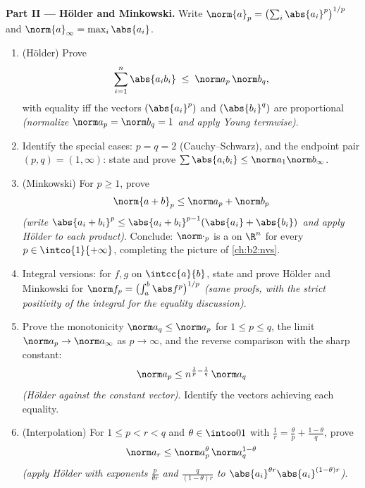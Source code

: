 \begin{problem}
\medskip
\noindent\textbf{Part II --- H\"older and Minkowski.} Write
$\norm{a}_p = \bigl(\sum_i \abs{a_i}^p\bigr)^{1/p}$ and
$\norm{a}_\infty = \max_i\abs{a_i}$.
\begin{enumerate}[resume]
  \item (H\"older) Prove
        \[
        \sum_{i=1}^{n}\abs{a_ib_i} \;\leq\;
        \norm a_p\,\norm b_q ,
        \]
        with equality iff the vectors $(\abs{a_i}^p)$ and
        $(\abs{b_i}^q)$ are proportional \emph{(normalize
        $\norm a_p = \norm b_q = 1$ and apply Young termwise)}.
  \item Identify the special cases: $p = q = 2$
        (Cauchy--Schwarz), and the endpoint pair $(p, q) = (1,
        \infty)$: state and prove $\sum\abs{a_ib_i} \leq
        \norm a_1\norm b_\infty$.
  \item (Minkowski) For $p \geq 1$, prove
        \[
        \norm{a + b}_p \leq \norm a_p + \norm b_p
        \]
        \emph{(write $\abs{a_i + b_i}^p \leq \abs{a_i +
        b_i}^{p-1}(\abs{a_i} + \abs{b_i})$ and apply H\"older
        to each product)}. Conclude: $\norm\cdot_p$ is a 
        on $\R^n$ for every $p \in \intco{1}{+\infty}$,
        completing the picture of \cref{ch:b2:nvs}.
  \item Integral versions: for $f, g$  on
        $\intcc{a}{b}$, state and prove H\"older and Minkowski
        for $\norm f_p = \bigl(\int_a^b\abs
        f^p\bigr)^{1/p}$ \emph{(same proofs, with the strict
        positivity of the integral for the equality
        discussion)}.
  \item Prove the monotonicity $\norm a_q \leq \norm a_p$ for $1
        \leq p \leq q$, the limit $\norm a_p \to
        \norm a_\infty$ as $p \to \infty$, and the reverse
        comparison with the sharp constant:
        \[
        \norm a_p \leq n^{\frac1p - \frac1q}\,\norm a_q
        \]
        \emph{(H\"older against the constant vector)}. Identify
        the vectors achieving each equality.
  \item (Interpolation) For $1 \leq p < r < q$ and $\theta \in
        \intoo01$ with $\frac1r = \frac\theta p +
        \frac{1-\theta}q$, prove
        \[
        \norm a_r \leq \norm a_p^{\theta}\,
        \norm a_q^{1-\theta}
        \]
        \emph{(apply H\"older with exponents $\frac{p}{\theta
        r}$ and $\frac{q}{(1-\theta)r}$ to $\abs{a_i}^{\theta
        r}\abs{a_i}^{(1-\theta)r}$)}.
\end{enumerate}


\end{problem}
